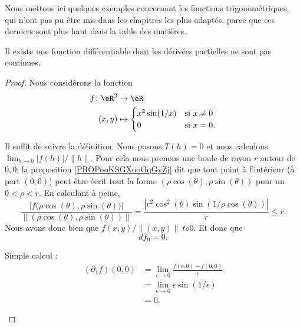 Nous mettons ici quelques exemples concernant les fonctions trigonométriques, qui n'ont pas pu être mis dans les chapitres les plus adaptés, parce que ces derniers sont plus haut dans la table des matières.



\begin{proposition}     \label{PROPooJPRUooNOcXPJ}
	Il existe une fonction différentiable dont les dérivées partielles ne sont pas continues.
\end{proposition}

\begin{proof}
	Nous considérons la fonction
	\begin{equation}
		\begin{aligned}
			f\colon \eR^2 & \to \eR                                   \\
			(x,y)         & \mapsto \begin{cases}
				                        x^2\sin(1/x) & \text{si } x\neq 0 \\
				                        0            & \text{si }x=0.
			                        \end{cases}
		\end{aligned}
	\end{equation}
	\begin{subproof}
		\spitem[La fonction \( f\) est différentiable et \( df_0=0\)]
		Il suffit de suivre la définition. Nous posons \( T(h)=0\) et nous calculons \( \lim_{h\to0}| f(h) |/\| h \|\). Pour cela nous prenons une boule de rayon \( r\) autour de \( 0,0\); la proposition \ref{PROPooKSGXooOqGyZj} dit que tout point à l'intérieur (à part \( (0,0)\)) peut être écrit tout la forme \( (\rho \cos(\theta), \rho\sin(\theta))\) pour un \( 0<\rho<r\). En calculant à peine,
		\begin{equation}
			\frac{ | f\big( \rho\cos(\theta),\rho\sin(\theta) \big) | }{ \| (\rho\cos(\theta),\rho\sin(\theta)) \| }=\frac{ | r^2\cos^2(\theta)\sin(1/\rho\cos(\theta)) | }{ r }\leq r.
		\end{equation}
		Nous avons donc bien que \( f(x,y)/\| (x,y) \|\ to0\). Et donc que
		\begin{equation}
			df_0=0.
		\end{equation}

		\spitem[\((\partial_1f)(0,0))=0\)]
		Simple calcul :
		\begin{subequations}
			\begin{align}
				(\partial_1f)(0,0) & =\lim_{\epsilon\to 0}\frac{ f(\epsilon,0)-f(0,0) }{ \epsilon } \\
				                   & =\lim_{\epsilon\to 0}\epsilon\sin(1/\epsilon)                  \\
				                   & =0.
			\end{align}
		\end{subequations}


\end{subproof}
\end{proof}
